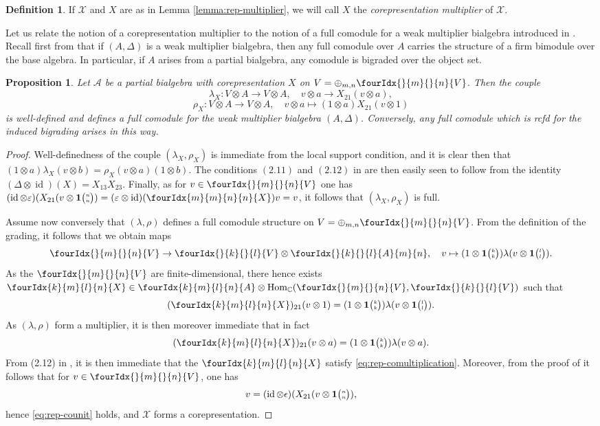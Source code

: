 \documentclass[10pt]{article}
\DeclareMathOperator{\id}{id}
\DeclareMathOperator{\Hom}{Hom}
\newcommand{\C}{\mathbb{C}}
\newcommand{\Grt}[3]{#1{\tiny{\begin{pmatrix} #2\\#3\end{pmatrix}}}}
\newcommand{\UnitC}[2]{\Grt{\mathbf{1}}{#1}{#2}}
\newcommand{\Gr}[5]{\fourIdx{#2}{#4}{#3}{#5}{#1}}%
\newcommand{\Gru}[3]{\Gr{#1}{}{}{#2}{#3}}
\newtheorem{Prop}[Theorem]{Proposition}
\theoremstyle{definition}
\newtheorem{Def}[Theorem]{Definition}
\numberwithin{equation}{section}
\begin{document}
\begin{Def} If $\mathscr{X}$ and $X$ are as in Lemma \ref{lemma:rep-multiplier}, we will call $X$ the \emph{corepresentation multiplier} of $\mathscr{X}$. 
\end{Def}

Let us relate the notion of a corepresentation multiplier to the
notion of a full comodule for a weak multiplier bialgebra introduced in \cite[Definition 2.2 and Definition 4.2]{Boh2}. Recall first from \cite[Theorem 4.5]{Boh2} that if $(A,\Delta)$ is a weak multiplier bialgebra, then any full comodule over $A$ carries the structure of a firm bimodule over the base algebra. In particular, if $A$ arises from a partial bialgebra, any comodule is bigraded over the object set. 

\begin{Prop} Let $\mathscr{A}$ be a partial bialgebra with corepresentation $X$ on $V = \oplus_{m,n} \Gru{V}{m}{n}$. Then the couple \[\lambda_X: V\otimes A \rightarrow V\otimes A,\quad v\otimes a \rightarrow X_{21}(v\otimes a),\] 
\[\rho_X: V\otimes A\rightarrow V\otimes A,\quad v\otimes a \mapsto (1\otimes a)X_{21}(v\otimes 1)\] is well-defined and defines a full comodule for the weak multiplier bialgebra $(A,\Delta)$. Conversely, any full comodule which is rcfd for the induced bigrading arises in this way.
\end{Prop} 

\begin{proof} Well-definedness of the couple $(\lambda_X,\rho_X)$ is immediate from the local support condition, and it is clear then that $(1\otimes a)\lambda_X(v\otimes b) = \rho_X(v\otimes a)(1\otimes b)$.  The conditions $(2.11)$ and $(2.12)$ in \cite[Definition 2.12]{Boh2} are then easily seen to follow from the identity $(\Delta\otimes \id)(X) = X_{13}X_{23}$. Finally, as for $v\in \Gru{V}{m}{n}$ one has $(\id\otimes \varepsilon)(X_{21}(v\otimes \UnitC{n}{n}) = (\varepsilon\otimes \id)(\Gr{X}{m}{n}{m}{n}) v  = v$, it follows that $(\lambda_X,\rho_X)$ is full.

Assume now conversely that $(\lambda,\rho)$ defines a full comodule structure on $V = \oplus_{m,n} \Gru{V}{m}{n}$. From the definition of the grading, it follows that we obtain maps \[\Gru{V}{m}{n}\rightarrow \Gru{V}{k}{l}\otimes \Gru{A}{k}{l}{m}{n},\quad v \mapsto (1\otimes \UnitC{k}{k})\lambda(v\otimes \UnitC{l}{l}).\] As the $\Gru{V}{m}{n}$ are finite-dimensional, there hence exists $\Gr{X}{k}{l}{m}{n} \in \Gr{A}{k}{l}{m}{n}\otimes \Hom_{\C}(\Gru{V}{m}{n},\Gru{V}{k}{l})$ such that  
\[(\Gr{X}{k}{l}{m}{n})_{21}(v\otimes 1)=(1\otimes \UnitC{k}{k})\lambda(v\otimes \UnitC{l}{l}).\] As $(\lambda,\rho)$ form a multiplier, it is then moreover immediate that in fact \[(\Gr{X}{k}{l}{m}{n})_{21}(v\otimes a) = (1\otimes \UnitC{k}{k})\lambda(v\otimes a).\] From (2.12) in \cite[Definition 2.12]{Boh2}, it is then immediate that the $\Gr{X}{k}{l}{m}{n}$ satisfy \eqref{eq:rep-comultiplication}. Moreover, from the proof of \cite[Theorem 4.5]{Boh2} it follows that for $v\in \Gru{V}{m}{n}$, one has \[v = (\id\otimes \epsilon)(X_{21}(v\otimes \UnitC{n}{n}),\] hence \eqref{eq:rep-counit} holds, and $\mathscr{X}$ forms a corepresentation. %
\end{proof}
\end{document}
